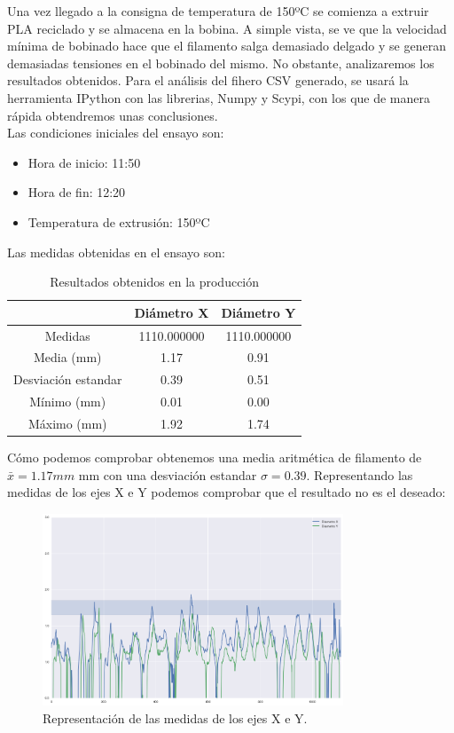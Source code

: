 Una vez llegado a la consigna de temperatura de 150ºC se comienza a extruir PLA reciclado y se almacena en la bobina. A simple vista, se ve que la velocidad mínima de bobinado hace que el filamento salga demasiado delgado y se generan demasiadas tensiones en el bobinado del mismo. No obstante, analizaremos los resultados obtenidos. Para el análisis del fihero CSV generado, se usará la herramienta IPython con las librerias, Numpy y Scypi, con los que de manera rápida obtendremos unas conclusiones.\\

Las condiciones iniciales del ensayo son:

	\begin{itemize}
		\item Hora de inicio: 11:50
		\item Hora de fin: 12:20
		\item Temperatura de extrusión: 150ºC
	\end{itemize}

Las medidas obtenidas en el ensayo son:

\begin{table}[H]
	\centering
	\begin{tabular}{ccc}
		{\bf } & {\bf Diámetro X} & {\bf Diámetro Y} \\ \hline
		Medidas & 1110.000000 & 1110.000000 \\
		Media (mm) & 1.17 & 0.91 \\
		Desviación estandar & 0.39 & 0.51 \\
		Mínimo (mm) & 0.01 & 0.00 \\
		Máximo (mm) & 1.92 & 1.74
	\end{tabular}
	\caption{Resultados obtenidos en la producción}
	\label{tab:result1}
\end{table}

Cómo podemos comprobar obtenemos una media aritmética de filamento de $ \bar{x} = 1.17mm $  mm con una desviación estandar $\sigma = 0.39$. Representando las medidas de los ejes X e Y podemos comprobar que el resultado no es el deseado:

\begin{figure}[H]
	\centering
	\includegraphics[width=0.8\textwidth]{images/producciones/16062015/output_9_1.png}
	\caption{Representación de las medidas de los ejes X e Y.}
	\label{fig:prod_ejes}
\end{figure}

